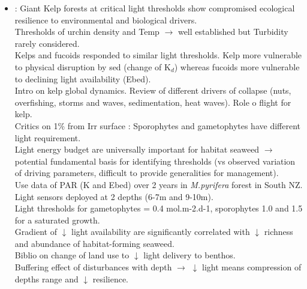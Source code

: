 \documentclass[]{report}
\begin{document}
\begin{itemize}
		\item \cite{tait2019giant} : Giant Kelp forests at critical light thresholds show compromised ecological resilience to environmental and biological drivers.
		\\ Thresholds of urchin density and Temp $\rightarrow$ well established but Turbidity rarely considered.
		\\Kelps and fucoids responded to similar light thresholds. Kelp more vulnerable to physical disruption by sed (change of K$_d$) whereas fucoids more vulnerable to declining light availability (Ebed).
		\\Intro on kelp global dynamics. Review of different drivers of collapse (nuts, overfishing, storms and waves, sedimentation, heat waves). Role o flight for kelp.
		\\ Critics on 1\% from Irr surface : Sporophytes and gametophytes have different light requirement.
		\\ Light energy budget are universally important for habitat seaweed $\rightarrow$ potential fundamental basis for identifying thresholds (vs observed variation of driving parameters, difficult to provide generalities for management).
		\\Use data of PAR (K and Ebed) over 2 years in \textit{M.pyrifera} forest in South NZ. Light sensors deployed at 2 depths (6-7m and 9-10m).
		\\Light thresholds for gametophytes = 0.4 mol.m-2.d-1, sporophytes 1.0 and 1.5 for a saturated growth.
		\\ Gradient of $\downarrow$ light availability are significantly correlated with $\downarrow$ richness and abundance of habitat-forming seaweed.
		\\Biblio on change of land use to $\downarrow$ light delivery to benthos.
		\\ Buffering effect of disturbances with depth $\rightarrow$ $\downarrow$ light means compression of depths range and $\downarrow$ resilience. 
		

\end{itemize}
\end{document}
